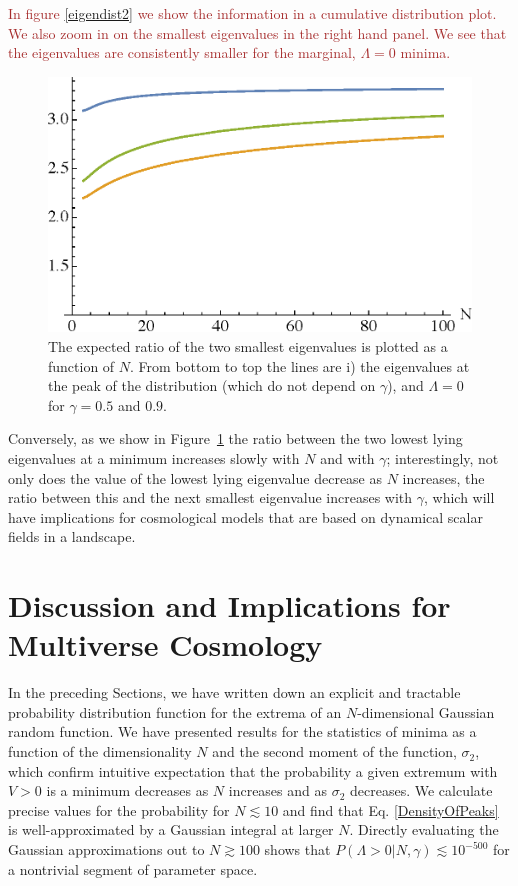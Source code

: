 \documentclass[12pt]{article}
\newcommand{\sh}[1]{\textcolor{brown}{#1}}
\begin{document}
\sh{In figure \ref{eigendist2} we show the information in a cumulative distribution plot. We also zoom in on the smallest eigenvalues in the right hand panel. We see that the eigenvalues are consistently smaller for the marginal, $\Lambda=0$ minima.}

\begin{figure} 
  \centering
  \includegraphics[width=.6\linewidth]{ratio.eps}  
  \caption{The expected ratio of the two smallest eigenvalues is plotted as a function of $N$.   From bottom to top the lines are i) the eigenvalues at the peak  of the distribution (which do not depend on $\gamma$), and $\Lambda=0$ for $\gamma =0.5$ and $0.9$.}
  \label{ratio}
\end{figure}

Conversely, as we show in Figure~\ref{ratio} the ratio between the two lowest lying eigenvalues at a minimum increases slowly with $N$ and with $\gamma$; interestingly, not only does the value of the lowest lying eigenvalue decrease as  $N$ increases, the ratio between this and the next smallest eigenvalue increases with $\gamma$, which will have implications for cosmological models that are based on dynamical scalar fields in a landscape. 





 
\section{Discussion and Implications for Multiverse Cosmology}

In the preceding Sections, we have  written down an explicit and tractable probability distribution function for the extrema of an $N$-dimensional  Gaussian random function. We have presented results for the statistics of minima as a function of the dimensionality $N$ and the second moment of the function, $\sigma_2$,  which confirm  intuitive expectation that the probability a given extremum with $V > 0$ is a minimum decreases as $N$ increases and as $\sigma_2$ decreases. We calculate precise values for the probability for $N \lesssim10$ and find that Eq. \ref{DensityOfPeaks} is well-approximated by a Gaussian integral at larger $N$. Directly evaluating the Gaussian approximations out to $N \gtrsim 100$ shows that $P(\Lambda > 0| N, \gamma) \lesssim 10^{-500}$ for a nontrivial segment of parameter space.  
\end{document}
